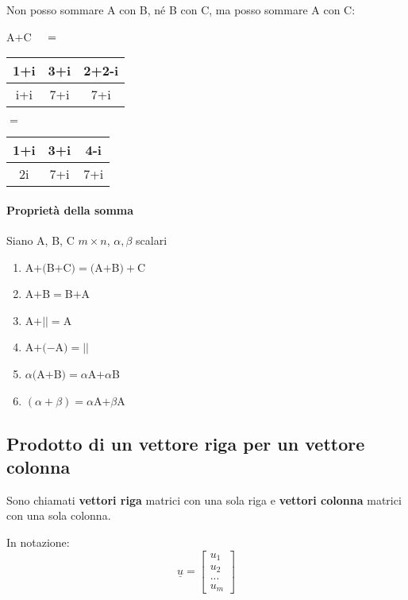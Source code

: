 Non posso sommare A con B, né B con C, ma posso sommare A con C:\\

\begin{center}
    A$+$C$\hspace{0.5cm}=\hspace{0.5cm}$
    \begin{tabular}{|c|c|c|}
        \hline
        1+i & 3+i & 2+2-i\\
        \hline
        i+i & 7+i & 7+i\\
        \hline
    \end{tabular}
    \hspace{0.5cm}$=$\hspace{0.5cm}
    \begin{tabular}{|c|c|c|}
        \hline
        1+i & 3+i & 4-i\\
        \hline
        2i & 7+i & 7+i\\
        \hline
    \end{tabular}
\end{center}
\paragraph{Proprietà della somma} Siano A, B, C $m\times n$, $\alpha,\beta$ scalari
\begin{enumerate}
    \item A$+($B$+$C$)=($A$+$B$)+$C
    \item A$+$B$=$B$+$A
    \item A$+||=$A
    \item A$+(-$A$)=||$
    \item $\alpha($A$+$B$)=\alpha$A$+\alpha$B
    \item $(\alpha + \beta) = \alpha$A$ +\beta$A
\end{enumerate}

\subsection{Prodotto di un vettore riga per un vettore colonna}
Sono chiamati \textbf{vettori riga} matrici con una sola riga e \textbf{vettori colonna} matrici con una sola colonna.

In notazione:
$$\underline u = 
\begin{bmatrix} 
    u_1 \\ u_2 \\ ... \\ u_m
\end{bmatrix} 
$$

